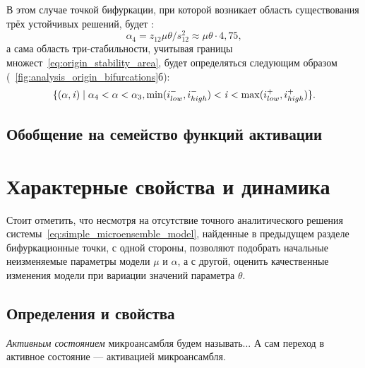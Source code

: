 В этом случае точкой бифуркации, при которой возникает область существования трёх устойчивых решений, будет :
\begin{equation}
    \nonumber
    \alpha_{4} = z_{12} \mu \theta / s_{12}^{2} \approx  \mu \theta \cdot 4,75,
\end{equation}
а сама область три-стабильности, учитывая границы множест~\eqref{eq:origin_stability_area}, будет определяться следующим образом (\seefigure~\ref{fig:analysis_origin_bifurcations}б):
\begin{equation}
    \nonumber
    \{ (\alpha, \mathit{i}) \mid \alpha_{4} < \alpha < \alpha_{3}, \min(i^{-}_{low}, i^{-}_{high}) < \mathit{i} < \max(i^{+}_{low}, i^{+}_{high}) \}.
\end{equation}

\newpage
\subsection{Обобщение на семейство функций активации}  \label{subsection:analysis_custom}


\newpage
\section{Характерные свойства и динамика} \label{section:neuron_dynamic}

Стоит отметить, что несмотря на отсутствие точного аналитического решения системы~\eqref{eq:simple_microensemble_model}, найденные в предыдущем разделе бифуркационные точки, с одной стороны, позволяют подобрать начальные неизменяемые параметры модели $\mu$ и $\alpha$, а с другой, оценить качественные изменения модели при вариации значений параметра $\theta$.

\subsection{Определения и свойства}

\begin{Definition}
    \textit{Активным состоянием} микроансамбля будем называть...
    А сам переход в активное состояние --- активацией микроансамбля.
\end{Definition}

